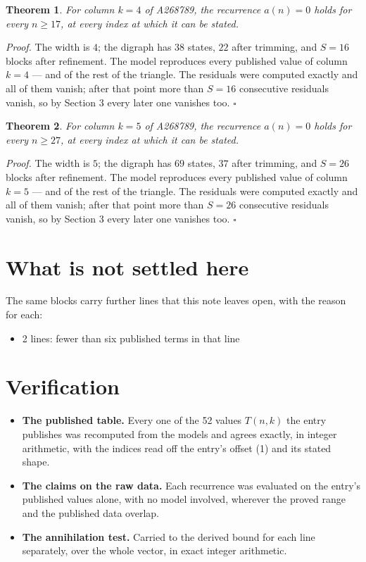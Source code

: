 \documentclass[11pt]{article}
\newtheorem{theorem}{Theorem}
\theoremstyle{definition}
\begin{document}
\begin{theorem} For column $k = 4$ of A268789, the recurrence $a(n) = 0$ holds for every $n \ge 17$, at every index at which it can be stated.\end{theorem}

{\itshape Proof.} The width is $4$; the digraph has $38$ states, $22$ after trimming, and $S = 16$ blocks after refinement. The model reproduces every published value of column $k = 4$ --- and of the rest of the triangle. The residuals were computed exactly and all of them vanish; after that point more than $S = 16$ consecutive residuals vanish, so by Section 3 every later one vanishes too. $\square$

\begin{theorem} For column $k = 5$ of A268789, the recurrence $a(n) = 0$ holds for every $n \ge 27$, at every index at which it can be stated.\end{theorem}

{\itshape Proof.} The width is $5$; the digraph has $69$ states, $37$ after trimming, and $S = 26$ blocks after refinement. The model reproduces every published value of column $k = 5$ --- and of the rest of the triangle. The residuals were computed exactly and all of them vanish; after that point more than $S = 26$ consecutive residuals vanish, so by Section 3 every later one vanishes too. $\square$

\section{What is not settled here}

The same blocks carry further lines that this note leaves open, with the reason for each:

\begin{itemize}

\item 2 lines: fewer than six published terms in that line

\end{itemize}

\section{Verification}

\begin{itemize}

\item {\bfseries The published table.} Every one of the 52 values $T(n,k)$ the entry publishes was recomputed from the models and agrees exactly, in integer arithmetic, with the indices read off the entry's offset (1) and its stated shape.

\item {\bfseries The claims on the raw data.} Each recurrence was evaluated on the entry's published values alone, with no model involved, wherever the proved range and the published data overlap.

\item {\bfseries The annihilation test.} Carried to the derived bound for each line separately, over the whole vector, in exact integer arithmetic.

\end{itemize}
\end{document}
